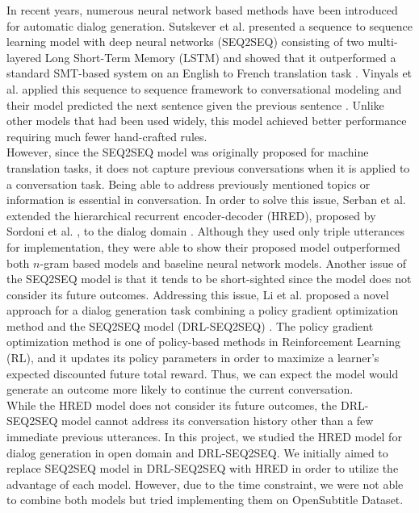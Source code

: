 In recent years, numerous neural network based methods have been introduced for automatic dialog generation. Sutskever et al. presented a sequence to sequence learning model with deep neural networks (SEQ2SEQ) consisting of two multi-layered Long Short-Term Memory (LSTM) and showed that it outperformed a standard SMT-based system on an English to French translation task \cite{Sutskever}. Vinyals et al. applied this sequence to sequence framework to conversational modeling and their model predicted the next sentence given the previous sentence \cite{Vinyals}. Unlike other models that had been used widely, this model achieved better performance requiring much fewer hand-crafted rules. \\
However, since the SEQ2SEQ model was originally proposed for machine translation tasks, it does not capture previous conversations when it is applied to a conversation task. Being able to address previously mentioned topics or information is essential in conversation. In order to solve this issue, Serban et al. extended the hierarchical recurrent encoder-decoder (HRED), proposed by Sordoni et al. \cite{Sordoni}, to the dialog domain \cite{Serban}. Although they used only triple utterances for implementation, they were able to show their proposed model outperformed both $n$-gram based models and baseline neural network models. Another issue of the SEQ2SEQ model is that it tends to be short-sighted since the model does not consider its future outcomes. Addressing this issue, Li et al. proposed a novel approach for a dialog generation task combining a policy gradient optimization method and the SEQ2SEQ model (DRL-SEQ2SEQ) \cite{Li}. The policy gradient optimization method is one of policy-based methods in Reinforcement Learning (RL), and it updates its policy parameters in order to maximize a learner's expected discounted future total reward. Thus, we can expect the model would generate an outcome more likely to continue the current conversation. \\
While the HRED model does not consider its future outcomes, the DRL-SEQ2SEQ model cannot address its conversation history other than a few immediate previous utterances. In this project, we studied the HRED model for dialog generation in open domain \cite{Serban} and DRL-SEQ2SEQ. We initially aimed to replace SEQ2SEQ model in DRL-SEQ2SEQ with HRED in order to utilize the advantage of each model. However, due to the time constraint, we were not able to combine both models but tried implementing them on OpenSubtitle Dataset. 